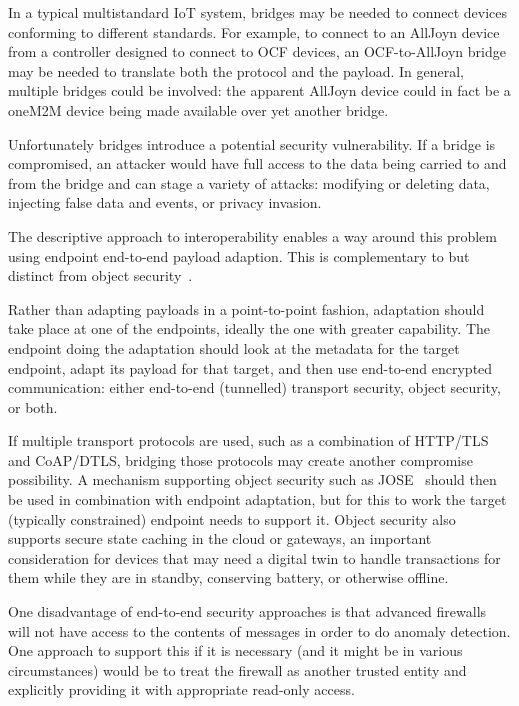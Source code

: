 In a typical multistandard IoT system,
bridges may be needed to connect devices
conforming to different standards.
For example,
to connect to an AllJoyn device from a controller
designed to connect to OCF devices, an OCF-to-AllJoyn bridge
may be needed to translate both the protocol and the payload.
In general, multiple bridges could be involved: the
apparent AllJoyn device could in fact be a oneM2M device
being made available over yet another bridge.

Unfortunately bridges introduce a potential security vulnerability.
If a bridge is compromised,
an attacker would have full access to the
data being carried to and from the bridge and can stage a 
variety of attacks: 
modifying or deleting data,
injecting false data and events,
or privacy invasion.

The descriptive approach to interoperability 
enables a way around this problem using endpoint 
end-to-end payload adaption.
This is complementary to but distinct from object security~\cite{Mattsson2014}.

Rather than adapting payloads in a point-to-point fashion,
adaptation should take place at one of the endpoints, ideally the
one with greater capability.  The endpoint doing the adaptation should
look at the metadata for the target endpoint, adapt its payload for that
target, and then use end-to-end encrypted communication:
either end-to-end (tunnelled) transport security, object security, or both.

If multiple transport protocols are used, such as a 
combination of HTTP/TLS and CoAP/DTLS, bridging those protocols
may create another compromise possibility.  A mechanism supporting
object security such as JOSE~\cite{Jose2014} should then be used
in combination with endpoint adaptation, but for this to
work the target (typically constrained) endpoint needs to support it. 
Object security also supports secure state caching in the cloud or gateways,
an important consideration for devices that may need a digital
twin to handle transactions for them while they are in standby,
conserving battery, or otherwise offline.

One disadvantage of end-to-end security approaches is that advanced
firewalls will not have access to the contents of messages in order to 
do anomaly detection.  One approach to support this if it is necessary
(and it might be in various circumstances) would be to treat the firewall
as another trusted entity and explicitly providing it with appropriate 
read-only access.
